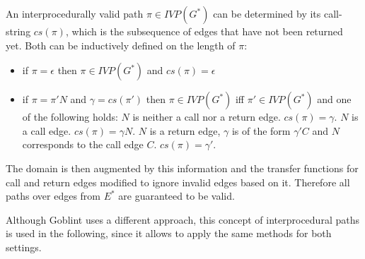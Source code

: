 An interprocedurally valid path $\pi \in \mathit{IVP}(G^*)$ can be determined by its call-string $cs(\pi)$, which is the subsequence of edges that have not been returned yet. Both can be inductively defined on the length of $\pi$:
\begin{itemize}
\item if $\pi = \epsilon$ then $\pi \in \mathit{IVP}(G^*)$ and $cs(\pi) = \epsilon$
\item if $\pi = \pi' N$ and $\gamma = cs(\pi')$ then $\pi \in \mathit{IVP}(G^*)$ iff $\pi' \in \mathit{IVP}(G^*)$ and one of the following holds:
\subitem $N$ is neither a call nor a return edge. $cs(\pi) = \gamma$.
\subitem $N$ is a call edge. $cs(\pi) = \gamma N$.
\subitem $N$ is a return edge, $\gamma$ is of the form $\gamma' C$ and $N$ corresponds to the call edge $C$. $cs(\pi) = \gamma'$.
\end{itemize}

The domain is then augmented by this information and the transfer functions for call and return edges modified to ignore invalid edges based on it. Therefore all paths over edges from $E^*$ are guaranteed to be valid.

Although Goblint uses a different approach, this concept of interprocedural paths is used in the following, since it allows to apply the same methods for both settings.




